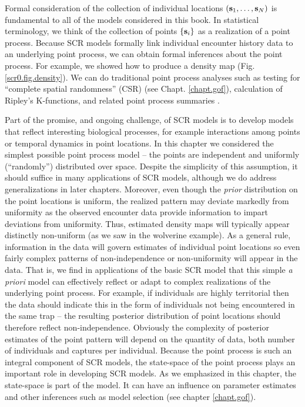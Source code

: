 {Formal consideration of the collection of individual locations $({\bf
  s}_{1}, \ldots, {\bf s}_{N})$  is fundamental to all of
the models considered in this book. In statistical terminology, we
think of the collection of points $\{ {\bf s}_{i} \}$ as a realization of a
point process. 
Because SCR models formally link individual encounter history data to
an underlying point process, we can obtain formal inferences about the
point process. For example, we showed how to produce a density
map (Fig. \ref{scr0.fig.density}). We can do
traditional point process analyses such as testing for
``complete spatial randomness''
(CSR) (see Chapt.  \ref{chapt.gof}),
calculation of Ripley's K-functions,
and related point process summaries \citep{illian_etal:2008}.

Part of the promise, and ongoing challenge, of SCR
models is to develop models that reflect interesting biological
processes, for example interactions among points or temporal dynamics
in point locations.  In this chapter  we considered the simplest possible point
process model -- the points are independent and uniformly
(``randomly'') distributed over space. Despite the simplicity of this
assumption, it should suffice in many applications of SCR models, 
although we do address generalizations in later
chapters. Moreover, even though the {\it prior} distribution on the
point locations is uniform, the realized pattern may deviate markedly
from uniformity as the observed encounter data provide information to
impart deviations from uniformity. Thus,  estimated density maps
will typically appear distinctly non-uniform (as we saw in the
wolverine example).  As a general rule,
information in the data will govern estimates of individual point
locations so even fairly complex patterns of non-independence or
non-uniformity will appear in the data. That is, we find in
applications of the basic SCR model that this simple {\it a priori}
model can effectively reflect or adapt to complex realizations of the
underlying point process.  For example, if individuals are highly
territorial then the data should indicate this in the form of
individuals not being encountered in the same trap -- the resulting
posterior distribution of point locations should therefore reflect
non-independence.  Obviously the complexity of posterior estimates of
the point pattern will depend on the quantity of data, both number of
individuals and captures per individual.  Because the point process is
such an integral component of SCR models, the state-space of the point
process plays an important role in developing SCR models. As we
emphasized in this chapter, the state-space is part of
the model. It can have an influence on parameter estimates and other
inferences such as model selection (see chapter \ref{chapt.gof}).


}
